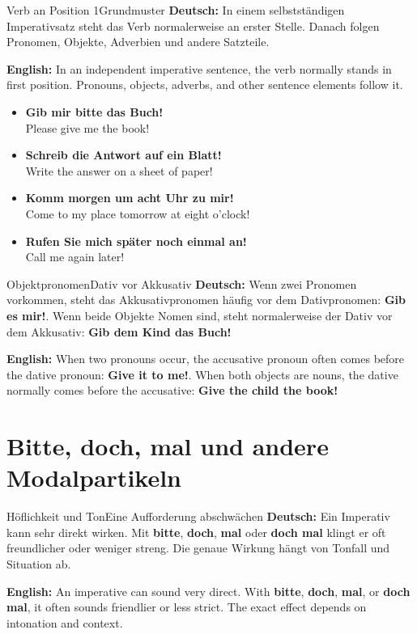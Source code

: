 \documentclass[a4paper,11pt]{article}
\newcommand{\GermanText}[1]{\textbf{Deutsch: }#1\par}
\newcommand{\EnglishText}[1]{{\small\color{SoftGray}\textbf{English: }#1\par}}
\newcommand{\ExampleItem}[2]{\item \textbf{#1}\\{\small\color{SoftGray}#2}}
\begin{document}
        \begin{grammarentry}{Verb an Position 1}{Grundmuster}
            \GermanText{In einem selbstständigen Imperativsatz steht das Verb normalerweise an erster Stelle. Danach folgen Pronomen, Objekte, Adverbien und andere Satzteile.}
            \EnglishText{In an independent imperative sentence, the verb normally stands in first position. Pronouns, objects, adverbs, and other sentence elements follow it.}
        \end{grammarentry}

        \begin{exbox}
            \begin{itemize}
                \ExampleItem{Gib mir bitte das Buch!}{Please give me the book!}
                \ExampleItem{Schreib die Antwort auf ein Blatt!}{Write the answer on a sheet of paper!}
                \ExampleItem{Komm morgen um acht Uhr zu mir!}{Come to my place tomorrow at eight o'clock!}
                \ExampleItem{Rufen Sie mich später noch einmal an!}{Call me again later!}
            \end{itemize}
        \end{exbox}

        \begin{grammarentry}{Objektpronomen}{Dativ vor Akkusativ}
            \GermanText{Wenn zwei Pronomen vorkommen, steht das Akkusativpronomen häufig vor dem Dativpronomen: \textbf{Gib es mir!}. Wenn beide Objekte Nomen sind, steht normalerweise der Dativ vor dem Akkusativ: \textbf{Gib dem Kind das Buch!}}
            \EnglishText{When two pronouns occur, the accusative pronoun often comes before the dative pronoun: \textbf{Give it to me!}. When both objects are nouns, the dative normally comes before the accusative: \textbf{Give the child the book!}}
        \end{grammarentry}

    \section{Bitte, doch, mal und andere Modalpartikeln}

        \begin{grammarentry}{Höflichkeit und Ton}{Eine Aufforderung abschwächen}
            \GermanText{Ein Imperativ kann sehr direkt wirken. Mit \textbf{bitte}, \textbf{doch}, \textbf{mal} oder \textbf{doch mal} klingt er oft freundlicher oder weniger streng. Die genaue Wirkung hängt von Tonfall und Situation ab.}
            \EnglishText{An imperative can sound very direct. With \textbf{bitte}, \textbf{doch}, \textbf{mal}, or \textbf{doch mal}, it often sounds friendlier or less strict. The exact effect depends on intonation and context.}
        \end{grammarentry}
\end{document}
